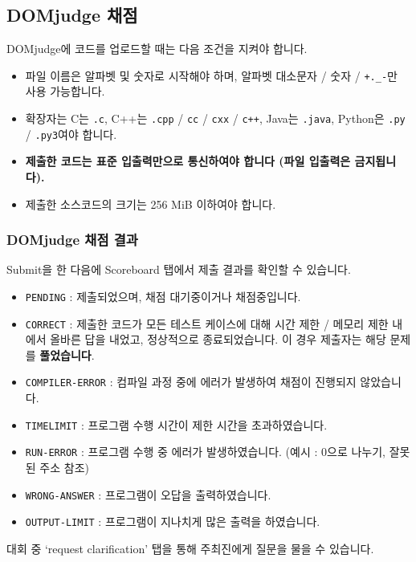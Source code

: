 \subsection*{DOMjudge 채점}
DOMjudge에 코드를 업로드할 때는 다음 조건을 지켜야 합니다.
\begin{itemize}
    \item 파일 이름은 알파벳 및 숫자로 시작해야 하며, 알파벳 대소문자 / 숫자 / \verb|+._-|만 사용 가능합니다.
    \item 확장자는 C는 \verb|.c|, C++는 \verb|.cpp| / \verb|cc| /  \verb|cxx| / \verb|c++|, Java는 \verb|.java|, Python은 \verb|.py| / \verb|.py3|여야 합니다.
    \item \textbf{제출한 코드는 표준 입출력만으로 통신하여야 합니다 (파일 입출력은 금지됩니다).}
    \item 제출한 소스코드의 크기는 256 MiB 이하여야 합니다.
\end{itemize}

\subsubsection*{DOMjudge 채점 결과}
Submit을 한 다음에 Scoreboard 탭에서 제출 결과를 확인할 수 있습니다.
\begin{itemize}
    \item {\color{gray}\texttt{PENDING}} : 제출되었으며, 채점 대기중이거나 채점중입니다.
    \item {\color{my-green}\texttt{CORRECT}} : 제출한 코드가 모든 테스트 케이스에 대해 시간 제한 / 메모리 제한 내에서 올바른 답을 내었고, 정상적으로 종료되었습니다. 이 경우 제출자는 해당 문제를 \textbf{풀었습니다}.
    \item {\color{red}\texttt{COMPILER-ERROR}} : 컴파일 과정 중에 에러가 발생하여 채점이 진행되지 않았습니다.
    \item {\color{red}\texttt{TIMELIMIT}} : 프로그램 수행 시간이 제한 시간을 초과하였습니다.
    \item {\color{red}\texttt{RUN-ERROR}} : 프로그램 수행 중 에러가 발생하였습니다. (예시 : 0으로 나누기, 잘못된 주소 참조)
    \item {\color{red}\texttt{WRONG-ANSWER}} : 프로그램이 오답을 출력하였습니다.
    \item {\color{red}\texttt{OUTPUT-LIMIT}} : 프로그램이 지나치게 많은 출력을 하였습니다.
\end{itemize}
대회 중 `request clarification' 탭을 통해 주최진에게 질문을 물을 수 있습니다.

